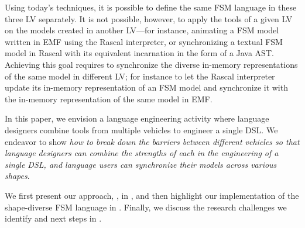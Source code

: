 Using today's techniques, it is possible to define the same FSM language in these three LV separately.
It is not possible, however, to apply the tools of a given LV on the models created in another LV---for instance, animating a FSM model written in EMF using the Rascal interpreter, or synchronizing a textual FSM model in Rascal with its equivalent incarnation in the form of a Java AST.
Achieving this goal requires to synchronize the diverse in-memory representations of the same model in different LV; for instance to let the Rascal interpreter update its in-memory representation of an FSM model and synchronize it with the in-memory representation of the same model in EMF.

In this paper, we envision a language engineering activity where language designers combine tools from multiple vehicles to engineer a single DSL.
We endeavor to show \emph{how to break down the barriers between different vehicles so that language designers can combine the strengths of each in the engineering of a single DSL, and language users can synchronize their models across various shapes}.

We first present our approach, \prism, in , and then highlight our implementation of the shape-diverse FSM language in .
Finally, we discuss the research challenges we identify and next steps in .
